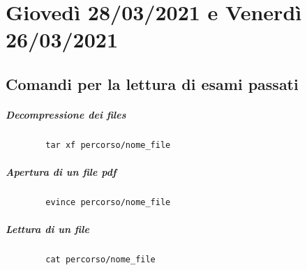 
\chapter{Giovedì 28/03/2021 e Venerdì 26/03/2021}
\section{Comandi per la lettura di esami passati}
\small
\begin{multicols}{3}
	\paragraph{Decompressione dei files}
	\begin{verbatim}
		tar xf percorso/nome_file
	\end{verbatim}
	\paragraph{Apertura di un file pdf}
	\begin{verbatim}
		evince percorso/nome_file
	\end{verbatim}
	\paragraph{Lettura di un file} 
	\begin{verbatim}
		cat percorso/nome_file
	\end{verbatim}
\end{multicols}
\normalsize
